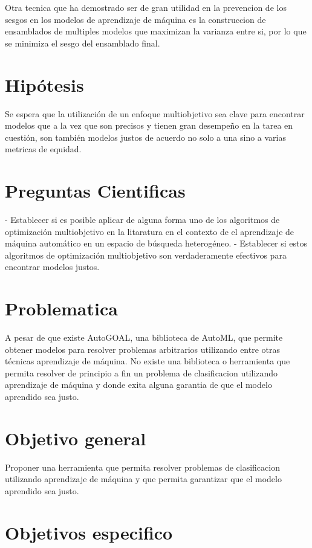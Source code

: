 Otra tecnica que ha demostrado ser de gran utilidad en la prevencion de los sesgos en los modelos de aprendizaje de máquina es la construccion de ensamblados de multiples modelos que maximizan la varianza entre si, por lo que se minimiza el sesgo del ensamblado final.

\section*{Hipótesis}

Se espera que la utilización de un enfoque multiobjetivo sea clave para encontrar modelos que a la vez que son precisos y tienen gran desempeño en la tarea en cuestión, son también modelos justos de acuerdo no solo a una sino a varias metricas de equidad.

\section*{Preguntas Cientificas}

- Establecer si es posible aplicar de alguna forma uno de los algoritmos de optimización multiobjetivo en la litaratura en el contexto de el aprendizaje de máquina automático en un espacio de búsqueda heterogéneo.
- Establecer si estos algoritmos de optimización multiobjetivo son verdaderamente efectivos para encontrar modelos justos.

\section*{Problematica}

A pesar de que existe AutoGOAL, una biblioteca de AutoML, que permite obtener modelos para resolver problemas arbitrarios utilizando entre otras técnicas aprendizaje de máquina. No existe una biblioteca o herramienta que permita resolver de principio a fin un problema de clasificacion utilizando aprendizaje de máquina y donde exita alguna garantia de que el modelo aprendido sea justo.

\section*{Objetivo general}

Proponer una herramienta que permita resolver problemas de clasificacion utilizando aprendizaje de máquina y que permita garantizar que el modelo aprendido sea justo.

\section*{Objetivos especifico}

